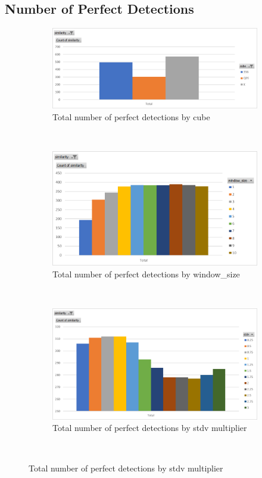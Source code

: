 \subsection{Number of Perfect Detections}
\begin{figure}
\begin{subfigure}{\textwidth}
    \centering
    \caption{Total number of perfect detections by cube}
    \label{fig:perfect-detections-by-cube}
    \includegraphics[width=0.75\linewidth]{Figures/7 Evaluation/perfect_detections_by_cube.png}
\end{subfigure}\\

\begin{subfigure}{\textwidth}
    \centering
    \caption{Total number of perfect detections by window\_size}
    \label{fig:perfect-detections-by-window-size}
    \includegraphics[width=0.75\linewidth]{Figures/7 Evaluation/perfect_detections_by_window_size.png}
\end{subfigure}\\

\begin{subfigure}{\textwidth}
    \centering
    \caption{Total number of perfect detections by stdv multiplier}
    \label{fig:perfect-detections-by-stdv}
    \includegraphics[width=0.75\linewidth]{Figures/7 Evaluation/perfect_detections_by_stdv.png}
\end{subfigure}\\


\end{figure}
